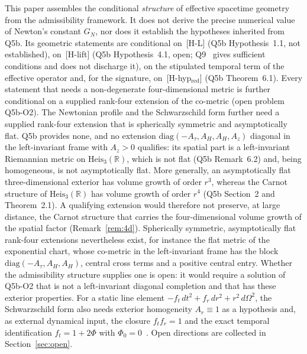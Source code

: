 \documentclass[11pt,a4paper]{article}
\begin{document}
    This paper assembles the conditional \emph{structure} of effective spacetime geometry from the admissibility
    framework.
    It does not derive the precise numerical value of Newton's constant $G_N$, nor does it establish the hypotheses
    inherited from Q5b.
    Its geometric statements are conditional on~[H-L] (Q5b Hypothesis~1.1, not established), on~[H-lift]
    (Q5b Hypothesis~4.1, open; Q9~\cite{Beau2026q9} gives sufficient conditions and does not discharge it), on the
    stipulated temporal term of the effective operator and, for the signature, on~[H-hyp$_{\mathrm{red}}$] (Q5b
    Theorem~6.1).
    Every statement that needs a non-degenerate four-dimensional metric is further conditional on a supplied rank-four
    extension of the co-metric (open problem Q5b-O2).
    The Newtonian profile and the Schwarzschild form further need a supplied rank-four extension that is spherically
    symmetric and asymptotically flat.
    Q5b provides none, and no extension $\mathrm{diag}(-A_\tau, A_H, A_H, A_z)$ diagonal in the left-invariant frame
    with $A_z > 0$ qualifies: its spatial part is a left-invariant Riemannian metric on $\mathrm{Heis}_3(\mathbb{R})$,
    which is not flat (Q5b Remark~6.2) and, being homogeneous, is not asymptotically flat.
    More generally, an asymptotically flat three-dimensional exterior has volume growth of order $r^3$, whereas the
    Carnot structure of $\mathrm{Heis}_3(\mathbb{R})$ has volume growth of order $r^4$ (Q5b Section~2 and
    Theorem~2.1).
    A qualifying extension would therefore not preserve, at large distance, the Carnot structure that carries the
    four-dimensional volume growth of the spatial factor (Remark~\ref{rem:4d}).
    Spherically symmetric, asymptotically flat rank-four extensions nevertheless exist, for instance the flat metric of
    the exponential chart, whose co-metric in the left-invariant frame has the block $\mathrm{diag}(-A_\tau, A_H, A_H)$,
    central cross terms and a positive central entry.
    Whether the admissibility structure supplies one is open: it would require a solution of Q5b-O2 that is not a
    left-invariant diagonal completion and that has these exterior properties.
    For a static line element $-f_t\,dt^2 + f_r\,dr^2 + r^2\,d\Omega^2$, the Schwarzschild form also needs exterior
    homogeneity $A_r \equiv 1$ as a hypothesis and, as external dynamical input, the closure $f_t f_r = 1$ and the
    exact temporal identification $f_t = 1 + 2\Phi$ with $\Phi_0 = 0$~\cite{Beau2026c}.
    Open directions are collected in Section~\ref{sec:open}.
\end{document}
